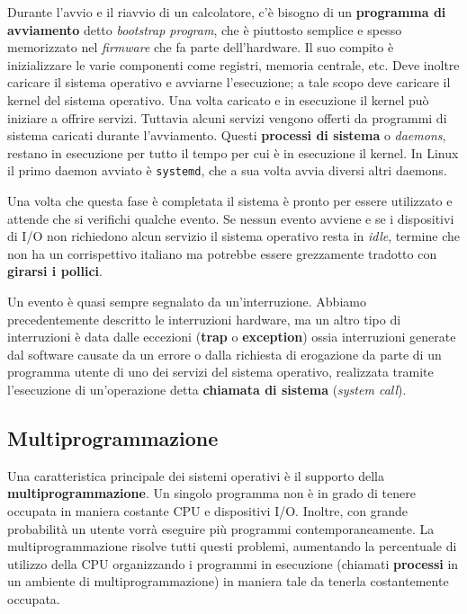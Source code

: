     Durante l'avvio e il riavvio di un calcolatore, c'è bisogno di un \textbf{programma di avviamento} detto \textit{bootstrap program}, che è piuttosto semplice e spesso memorizzato nel \textit{firmware} che fa parte dell'hardware. Il suo compito è inizializzare le varie componenti come registri, memoria centrale, etc. Deve inoltre caricare il sistema operativo e avviarne l'esecuzione; a tale scopo deve caricare il kernel del sistema operativo.
    Una volta caricato e in esecuzione il kernel può iniziare a offrire servizi. Tuttavia alcuni servizi vengono offerti da programmi di sistema caricati durante l'avviamento. Questi \textbf{processi di sistema} o \textit{daemons}, restano in esecuzione per tutto il tempo per cui è in esecuzione il kernel. In Linux il primo daemon avviato è \texttt{systemd}, che a sua volta avvia diversi altri daemons.
            
    Una volta che questa fase è completata il sistema è pronto per essere utilizzato e attende che si verifichi qualche evento. Se nessun evento avviene e se i dispositivi di I/O non richiedono alcun servizio il sistema operativo resta in \textit{idle}, termine che non ha un corrispettivo italiano ma potrebbe essere grezzamente tradotto con \textbf{girarsi i pollici}.
            
    Un evento è quasi sempre segnalato da un'interruzione. Abbiamo precedentemente descritto le interruzioni hardware, ma un altro tipo di interruzioni è data dalle eccezioni (\textbf{trap} o \textbf{exception}) ossia interruzioni generate dal software causate da un errore o dalla richiesta di erogazione da parte di un programma utente di uno dei servizi del sistema operativo, realizzata tramite l'esecuzione di un'operazione detta \textbf{chiamata di sistema} (\textit{system call}).
            
    \subsection{Multiprogrammazione}
        Una caratteristica principale dei sistemi operativi è il supporto della \textbf{multiprogrammazione}. Un singolo programma non è in grado di tenere occupata in maniera costante CPU e dispositivi I/O. Inoltre, con grande probabilità un utente vorrà eseguire più programmi contemporaneamente. La multiprogrammazione risolve tutti questi problemi, aumentando la percentuale di utilizzo della CPU organizzando i programmi in esecuzione (chiamati \textbf{processi} in un ambiente di multiprogrammazione) in maniera tale da tenerla costantemente occupata.
                

